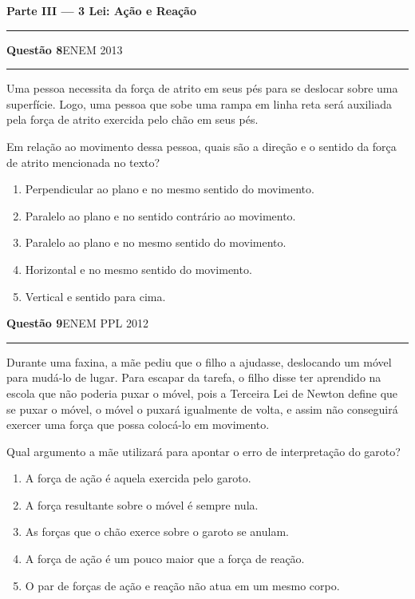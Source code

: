 \documentclass[11pt,a4paper]{article}
\newcommand{\fonte}[1]{{\small\scshape\color{grafite}#1}}
\newenvironment{questao}[2]{%
  \needspace{6\baselineskip}
  \par\addvspace{1.6em}
  {\large\bfseries\color{vinho}Quest\~ao #1}\hfill #2\\[-0.55em]
  {\color{black!25}\rule{\linewidth}{0.4pt}}
  \par\nobreak\smallskip
}{\par\addvspace{0.4em}}
\newcommand{\parte}[1]{%
  \needspace{7\baselineskip}
  \vspace{1.8em}
  {\Large\bfseries #1}\\[-0.55em]
  {\color{black!30}\rule{\linewidth}{0.5pt}}
  \par\nobreak\smallskip
}
\begin{document}
\parte{Parte III --- 3\textordfeminine{} Lei: A\c{c}\~ao e Rea\c{c}\~ao}

\begin{questao}{8}{\fonte{ENEM 2013}}
Uma pessoa necessita da for\c{c}a de atrito em seus p\'es para se
deslocar sobre uma superf\'icie. Logo, uma pessoa que sobe uma rampa em
linha reta ser\'a auxiliada pela for\c{c}a de atrito exercida pelo
ch\~ao em seus p\'es.

Em rela\c{c}\~ao ao movimento dessa pessoa, quais s\~ao a dire\c{c}\~ao
e o sentido da for\c{c}a de atrito mencionada no texto?
\begin{enumerate}
  \item Perpendicular ao plano e no mesmo sentido do movimento.
  \item Paralelo ao plano e no sentido contr\'ario ao movimento.
  \item Paralelo ao plano e no mesmo sentido do movimento.
  \item Horizontal e no mesmo sentido do movimento.
  \item Vertical e sentido para cima.
\end{enumerate}
\end{questao}

\begin{questao}{9}{\fonte{ENEM PPL 2012}}
Durante uma faxina, a m\~ae pediu que o filho a ajudasse, deslocando um
m\'ovel para mud\'a-lo de lugar. Para escapar da tarefa, o filho disse
ter aprendido na escola que n\~ao poderia puxar o m\'ovel, pois a
Terceira Lei de Newton define que se puxar o m\'ovel, o m\'ovel o
puxar\'a igualmente de volta, e assim n\~ao conseguir\'a exercer uma
for\c{c}a que possa coloc\'a-lo em movimento.

Qual argumento a m\~ae utilizar\'a para apontar o erro de
interpreta\c{c}\~ao do garoto?
\begin{enumerate}
  \item A for\c{c}a de a\c{c}\~ao \'e aquela exercida pelo garoto.
  \item A for\c{c}a resultante sobre o m\'ovel \'e sempre nula.
  \item As for\c{c}as que o ch\~ao exerce sobre o garoto se anulam.
  \item A for\c{c}a de a\c{c}\~ao \'e um pouco maior que a for\c{c}a de
        rea\c{c}\~ao.
  \item O par de for\c{c}as de a\c{c}\~ao e rea\c{c}\~ao n\~ao atua em
        um mesmo corpo.
\end{enumerate}
\end{questao}
\end{document}
